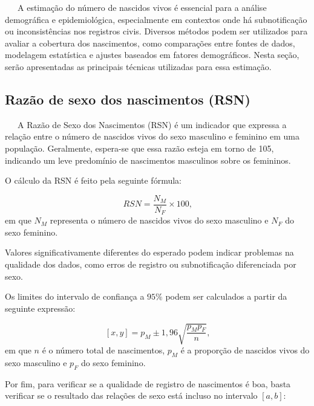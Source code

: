 \documentclass[
  12pt,
  a4paper,
]{scrreprt}
\begin{document}
~~~A estimação do número de nascidos vivos é essencial para a análise
demográfica e epidemiológica, especialmente em contextos onde há
subnotificação ou inconsistências nos registros civis. Diversos métodos
podem ser utilizados para avaliar a cobertura dos nascimentos, como
comparações entre fontes de dados, modelagem estatística e ajustes
baseados em fatores demográficos. Nesta seção, serão apresentadas as
principais técnicas utilizadas para essa estimação.

\subsection{Razão de sexo dos nascimentos
(RSN)}\label{razuxe3o-de-sexo-dos-nascimentos-rsn}

~~~A Razão de Sexo dos Nascimentos (RSN) é um indicador que expressa a
relação entre o número de nascidos vivos do sexo masculino e feminino em
uma população. Geralmente, espera-se que essa razão esteja em torno de
105, indicando um leve predomínio de nascimentos masculinos sobre os
femininos.

\vspace{12pt}

O cálculo da RSN é feito pela seguinte fórmula:

\[
RSN = \frac{N_M}{N_F} \times 100 \text{,}
\] em que \(N_M\) representa o número de nascidos vivos do sexo
masculino e \(N_F\) do sexo feminino.

\vspace{12pt}

Valores significativamente diferentes do esperado podem indicar
problemas na qualidade dos dados, como erros de registro ou
subnotificação diferenciada por sexo.

\vspace{12pt}

Os limites do intervalo de confiança a \(95\%\) podem ser calculados a
partir da seguinte expressão:

\[
\left[x, y\right] = p_{M} \pm 1,96 \sqrt{\frac{p_{M}p_{F}}{n}} \text{,}
\] em que \(n\) é o número total de nascimentos, \(p_{M}\) é a proporção
de nascidos vivos do sexo masculino e \(p_{F}\) do sexo feminino.

\vspace{12pt}

Por fim, para verificar se a qualidade de registro de nascimentos é boa,
basta verificar se o resultado das relações de sexo está incluso no
intervalo \(\left[a, b\right]\):
\end{document}
